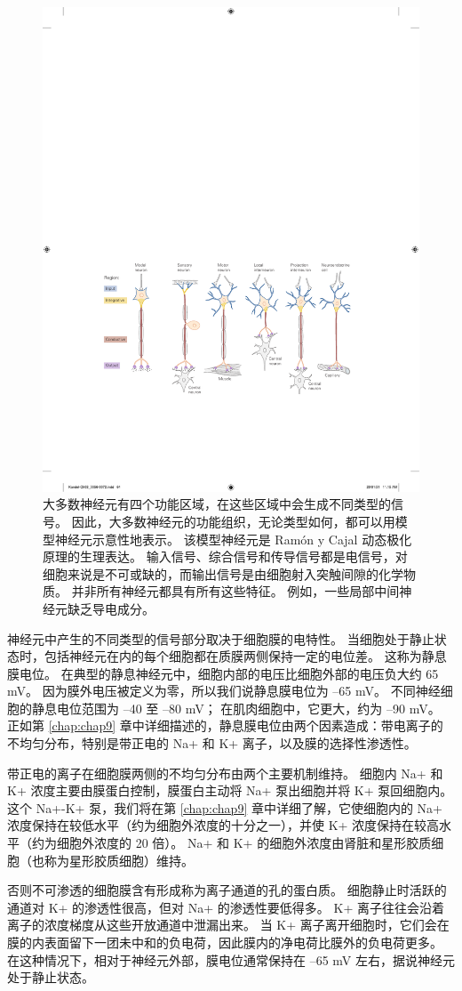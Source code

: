\begin{figure}[htbp]
	\centering
	\includegraphics[width=0.5\linewidth]{chap03/fig_3_8}
	\caption{大多数神经元有四个功能区域，在这些区域中会生成不同类型的信号。 
		因此，大多数神经元的功能组织，无论类型如何，都可以用模型神经元示意性地表示。 
		该模型神经元是 Ramón y Cajal 动态极化原理的生理表达。 
		输入信号、综合信号和传导信号都是电信号，对细胞来说是不可或缺的，而输出信号是由细胞射入突触间隙的化学物质。 
		并非所有神经元都具有所有这些特征。 
		例如，一些局部中间神经元缺乏导电成分。}
	\label{fig:3_8}
\end{figure}


神经元中产生的不同类型的信号部分取决于细胞膜的电特性。 
当细胞处于静止状态时，包括神经元在内的每个细胞都在质膜两侧保持一定的电位差。 
这称为静息膜电位。 
在典型的静息神经元中，细胞内部的电压比细胞外部的电压负大约 65 mV。 
因为膜外电压被定义为零，所以我们说静息膜电位为 –65 mV。 
不同神经细胞的静息电位范围为 –40 至 –80 mV； 
在肌肉细胞中，它更大，约为 –90 mV。 
正如第 \ref{chap:chap9} 章中详细描述的，静息膜电位由两个因素造成：带电离子的不均匀分布，特别是带正电的 Na+ 和 K+ 离子，以及膜的选择性渗透性。


带正电的离子在细胞膜两侧的不均匀分布由两个主要机制维持。 
细胞内 Na+ 和 K+ 浓度主要由膜蛋白控制，膜蛋白主动将 Na+ 泵出细胞并将 K+ 泵回细胞内。 
这个 Na+-K+ 泵，我们将在第 \ref{chap:chap9} 章中详细了解，它使细胞内的 Na+ 浓度保持在较低水平（约为细胞外浓度的十分之一），并使 K+ 浓度保持在较高水平（约为细胞外浓度的 20 倍）。 
Na+ 和 K+ 的细胞外浓度由肾脏和星形胶质细胞（也称为星形胶质细胞）维持。


否则不可渗透的细胞膜含有形成称为离子通道的孔的蛋白质。 细胞静止时活跃的通道对 K+ 的渗透性很高，但对 Na+ 的渗透性要低得多。 
K+ 离子往往会沿着离子的浓度梯度从这些开放通道中泄漏出来。 
当 K+ 离子离开细胞时，它们会在膜的内表面留下一团未中和的负电荷，因此膜内的净电荷比膜外的负电荷更多。 
在这种情况下，相对于神经元外部，膜电位通常保持在 –65 mV 左右，据说神经元处于静止状态。


